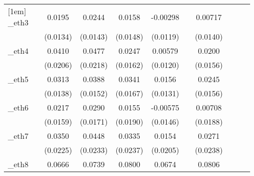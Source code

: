 \begin{table}[htbp]
\begin{tabular}{l*{9}{c}}
[1em]
\_eth3       &      0.0195         &      0.0244\sym{*}  &      0.0158         &    -0.00298         &                     &     0.00717         &                     &                     &                     \\
            &    (0.0134)         &    (0.0143)         &    (0.0148)         &    (0.0119)         &                     &    (0.0140)         &                     &                     &                     \\
[1em]
\_eth4       &      0.0410\sym{**} &      0.0477\sym{**} &      0.0247         &     0.00579         &                     &      0.0200         &                     &                     &                     \\
            &    (0.0206)         &    (0.0218)         &    (0.0162)         &    (0.0120)         &                     &    (0.0156)         &                     &                     &                     \\
[1em]
\_eth5       &      0.0313\sym{**} &      0.0388\sym{**} &      0.0341\sym{**} &      0.0156         &                     &      0.0245         &                     &                     &                     \\
            &    (0.0138)         &    (0.0152)         &    (0.0167)         &    (0.0131)         &                     &    (0.0156)         &                     &                     &                     \\
[1em]
\_eth6       &      0.0217         &      0.0290\sym{*}  &      0.0155         &    -0.00575         &                     &     0.00708         &                     &                     &                     \\
            &    (0.0159)         &    (0.0171)         &    (0.0190)         &    (0.0146)         &                     &    (0.0188)         &                     &                     &                     \\
[1em]
\_eth7       &      0.0350         &      0.0448\sym{*}  &      0.0335         &      0.0154         &                     &      0.0271         &                     &                     &                     \\
            &    (0.0225)         &    (0.0233)         &    (0.0237)         &    (0.0205)         &                     &    (0.0238)         &                     &                     &                     \\
[1em]
\_eth8       &      0.0666\sym{**} &      0.0739\sym{**} &      0.0800\sym{*}  &      0.0674         &                     &      0.0806\sym{*}  &                     &                     &                     \\

\end{tabular}
\end{table}
